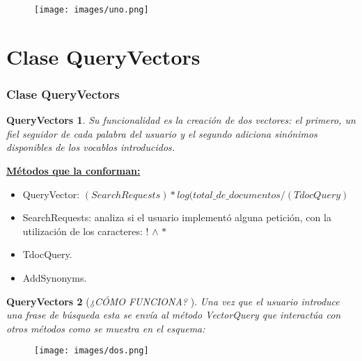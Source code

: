 \documentclass{beamer}
\newtheorem{teo}{QueryVectors}
\begin{document}
\begin{frame}

  \begin{figure}[h]
    \vspace{-1.3cm}
    \texttt{[image: images/uno.png]}
  \end{figure}

\end{frame}


\section{Clase QueryVectors}
\begin{frame}
  \frametitle{Clase QueryVectors}
  \vspace{-2.3cm}
  \begin{teo}
    Su funcionalidad es la creación de dos vectores: el primero, un fiel seguidor de cada palabra del usuario y el segundo adiciona sinónimos disponibles de los vocablos introducidos. 
  \end{teo}

  \textbf{\underline{Métodos que la conforman: }} 

\begin{itemize}
    \item  QueryVector: \((SearchRequests) * log(total\_de\_documentos / (TdocQuery)\) 
    \item SearchRequests: analiza si el usuario implementó alguna petición, con la utilización de los caracteres: !  $\land$ \(*\)
    \item TdocQuery. 
    \item AddSynonyms. 
\end{itemize}

\end{frame}

\begin{frame}
  \vspace{-1cm}
  \begin{teo}[\textit{¿CÓMO FUNCIONA? }]
    Una vez que el usuario introduce una frase de búsqueda esta se envía al método VectorQuery que interactúa con otros métodos como se muestra en el esquema: 
  \end{teo}

  \begin{figure}[h]
    \vspace{-0.3cm}
    \texttt{[image: images/dos.png]}
  \end{figure}
\end{frame}
\end{document}

